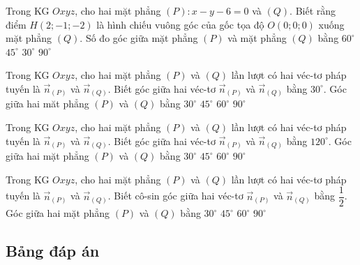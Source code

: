 \begin{ex}%
	Trong KG $Oxyz$, cho hai mặt phẳng $(P)\colon x-y-6=0$ và $(Q)$. Biết rằng điểm $H(2;-1;-2)$ là hình chiếu vuông góc của gốc tọa độ $O(0;0;0)$ xuống mặt phẳng $(Q)$. Số đo góc giữa mặt phẳng $(P)$ và mặt phẳng $(Q)$ bằng
	\choice
	{$60^{\circ}$}
	{\True $45^{\circ}$}
	{$30^{\circ}$}
	{$90^{\circ}$}
\end{ex}

\begin{ex}%
	Trong KG $Oxyz$, cho hai mặt phẳng $(P)$ và $(Q)$ lần lượt có hai véc-tơ pháp tuyến là $\overrightarrow{n}_{(P)}$ và $\overrightarrow{n}_{(Q)}$. Biết góc giữa hai véc-tơ $\overrightarrow{n}_{(P)}$ và $\overrightarrow{n}_{(Q)}$ bằng $30^{\circ}$. Góc giữa hai măt phẳng $(P)$ và $(Q)$ bằng
	\choice
	{\True $30^{\circ}$}
	{$45^{\circ}$}
	{$60^{\circ}$}
	{$90^{\circ}$}
\end{ex}

\begin{ex}%
	Trong KG $Oxyz$, cho hai mặt phẳng $(P)$ và $(Q)$ lần lượt có hai véc-tơ pháp tuyến là $\overrightarrow{n}_{(P)}$ và $\overrightarrow{n}_{(Q)}$. Biết góc giữa hai véc-tơ $\overrightarrow{n}_{(P)}$ và $\overrightarrow{n}_{(Q)}$ bằng $120^{\circ}$. Góc giữa hai mặt phẳng $(P)$ và $(Q)$ bằng
	\choice
	{$30^{\circ}$}
	{$45^{\circ}$}
	{\True $60^{\circ}$}
	{$90^{\circ}$}
\end{ex}

\begin{ex}%
	Trong KG $Oxyz$, cho hai mặt phẳng $(P)$ và $(Q)$ lần lượt có hai véc-tơ pháp tuyến là $\overrightarrow{n}_{(P)}$ và $\overrightarrow{n}_{(Q)}$. Biết cô-sin góc giữa hai véc-tơ $\overrightarrow{n}_{(P)}$ và $\overrightarrow{n}_{(Q)}$ bằng $\dfrac{1}{2}$. Góc giữa hai mặt phẳng $(P)$ và $(Q)$ bằng
	\choice
	{$30^{\circ}$}
	{$45^{\circ}$}
	{\True $60^{\circ}$}
	{$90^{\circ}$}
\end{ex}

\subsection{Bảng đáp án}
